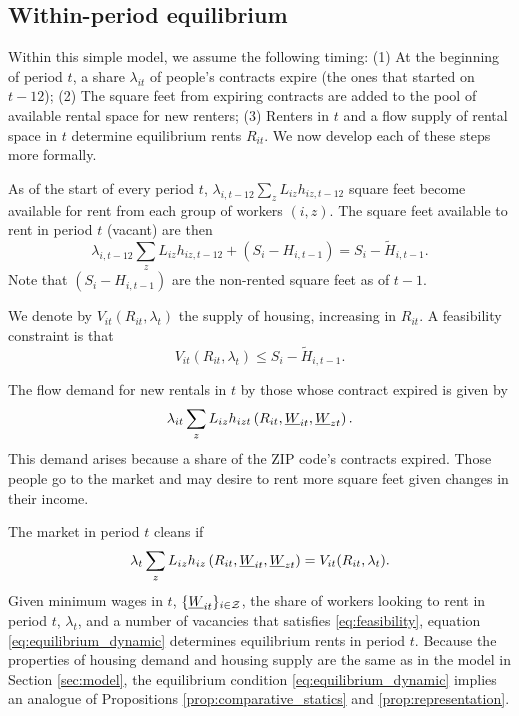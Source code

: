 \subsection*{Within-period equilibrium}

Within this simple model, we assume the following timing: 
(1) At the beginning of period $t$, a share $\lambda_{it}$ of people's contracts 
expire (the ones that started on $t-12$);
(2) The square feet from expiring contracts are added to the pool of available 
rental space for new renters;
(3) Renters in $t$ and a flow supply of rental space in $t$ determine equilibrium 
rents $R_{it}$.
We now develop each of these steps more formally.

As of the start of every period $t$, $\lambda_{i,t-12} \sum_z L_{iz} h_{iz,t-12}$ 
square feet become available for rent from each group of workers $(i,z)$.
The square feet available to rent in period $t$ (vacant) are then
$$
\lambda_{i,t-12} \sum_z L_{iz} h_{iz,t-12} + (S_i - H_{i,t-1}) = S_i - \tilde H_{i,t-1}.
$$
Note that $(S_i - H_{i,t-1})$ are the non-rented square feet as of $t-1$.

We denote by $V_{it}(R_{it}, \lambda_t)$ the supply of housing, increasing in 
$R_{it}$.
A feasibility constraint is that 
\begin{equation}\label{eq:feasibility}
    V_{it}(R_{it}, \lambda_t) \leq S_i - \tilde H_{i,t-1} .
\end{equation}

The flow demand for new rentals in $t$ by those whose contract expired is given by
$$
\lambda_{it} \sum_z L_{iz} h_{izt} \left(R_{it}, \underline{W}_{it}, \underline{W}_{zt} \right) .
$$
This demand arises because a share of the ZIP code's contracts expired. 
Those people go to the market and may desire to rent more square feet given changes 
in their income.

The market in period $t$ cleans if
\begin{equation}\label{eq:equilibrium_dynamic}
    \lambda_t \sum_z L_{iz} h_{iz} \left(R_{it}, \underline{W}_{it}, \underline{W}_{zt} \right) = 
    V_{it}(R_{it}, \lambda_t) .
\end{equation}
Given minimum wages in $t$, $\{\underline{W}_{it}\}_{i\in\mathcal{Z}}$,
the share of workers looking to rent in period $t$, $\lambda_t$, 
and a number of vacancies that satisfies \eqref{eq:feasibility}, 
equation \eqref{eq:equilibrium_dynamic} determines equilibrium rents in period $t$.
Because the properties of housing demand and housing supply are the same as in the
model in Section \ref{sec:model},
the equilibrium condition \eqref{eq:equilibrium_dynamic} implies an analogue of 
Propositions \ref{prop:comparative_statics} and \ref{prop:representation}.


